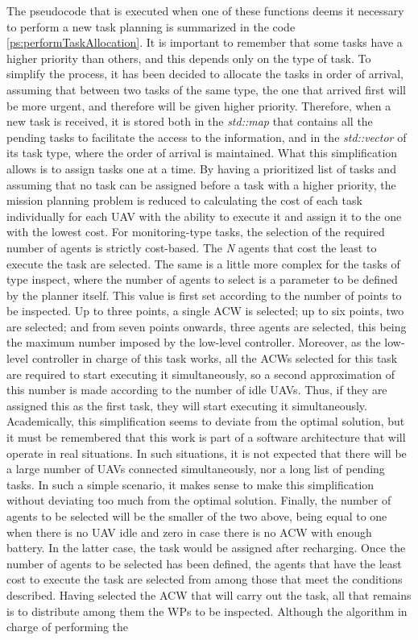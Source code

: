 The pseudocode that is executed when one of these functions deems it necessary to perform a new task planning is summarized in the code \ref{ps:performTaskAllocation}. It is important to remember that some tasks have a higher priority than others, and this depends only on the type of task. To simplify the process, it has been decided to allocate the tasks in order of arrival, assuming that between two tasks of the same type, the one that arrived first will be more urgent, and therefore will be given higher priority. Therefore, when a new task is received, it is stored both in the \emph{std::map} that contains all the pending tasks to facilitate the access to the information, and in the \emph{std::vector} of its task type, where the order of arrival is maintained. What this simplification allows is to assign tasks one at a time. By having a prioritized list of tasks and assuming that no task can be assigned before a task with a higher priority, the mission planning problem is reduced to calculating the cost of each task individually for each \gls{UAV} with the ability to execute it and assign it to the one with the lowest cost. For monitoring-type tasks, the selection of the required number of agents is strictly cost-based. The \emph{N} agents that cost the least to execute the task are selected. The same is a little more complex for the tasks of type inspect, where the number of agents to select is a parameter to be defined by the planner itself. This value is first set according to the number of points to be inspected. Up to three points, a single \gls{ACW} is selected; up to six points, two are selected; and from seven points onwards, three agents are selected, this being the maximum number imposed by the low-level controller. Moreover, as the low-level controller in charge of this task works, all the \glspl{ACW} selected for this task are required to start executing it simultaneously, so a second approximation of this number is made according to the number of idle \glspl{UAV}. Thus, if they are assigned this as the first task, they will start executing it simultaneously. Academically, this simplification seems to deviate from the optimal solution, but it must be remembered that this work is part of a software architecture that will operate in real situations. In such situations, it is not expected that there will be a large number of \glspl{UAV} connected simultaneously, nor a long list of pending tasks. In such a simple scenario, it makes sense to make this simplification without deviating too much from the optimal solution. Finally, the number of agents to be selected will be the smaller of the two above, being equal to one when there is no \gls{UAV} idle and zero in case there is no \gls{ACW} with enough battery. In the latter case, the task would be assigned after recharging. Once the number of agents to be selected has been defined, the agents that have the least cost to execute the task are selected from among those that meet the conditions described. Having selected the \gls{ACW} that will carry out the task, all that remains is to distribute among them the \glspl{WP} to be inspected. Although the algorithm in charge of performing the 